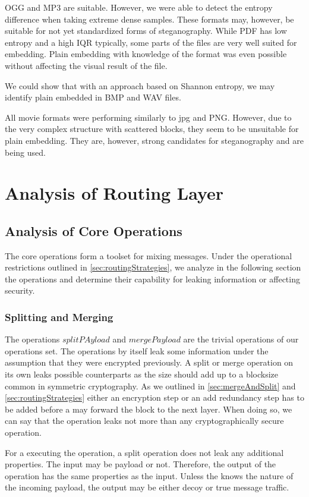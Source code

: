 OGG and MP3 are suitable. However, we were able to detect the entropy difference when taking extreme dense samples. These formats may, however, be suitable for not yet standardized forms of steganography. While PDF has low entropy and a high IQR typically, some parts of the files are very well suited for embedding. Plain embedding with knowledge of the format was even possible without affecting the visual result of the file.

We could show that with an approach based on Shannon entropy, we may identify plain embedded \VortexMessages in BMP and WAV files. 

All movie formats were performing similarly to jpg and PNG. However, due to the very complex structure with scattered blocks, they seem to be unsuitable for plain embedding. They are, however, strong candidates for steganography and are being used.

\section{Analysis of Routing Layer}
\subsection{Analysis of Core Operations}
The core operations form a toolset for mixing messages. Under the operational restrictions outlined in \cref{sec:routingStrategies}, we analyze in the following section the operations and determine their capability for leaking information or affecting security.

\subsubsection{Splitting and Merging}
The operations $splitPAyload$ and $mergePayload$ are the trivial operations of our operations set. The operations by itself leak some information under the assumption that they were encrypted previously. A split or merge operation on its own leaks possible counterparts as the size should add up to a blocksize common in symmetric cryptography. As we outlined in \cref{sec:mergeAndSplit} and \cref{sec:routingStrategies} either an encryption step or an add redundancy step has to be added before a \VortexNode{} may forward the block to the next layer. When doing so, we can say that the operation leaks not more than any cryptographically secure operation.

For a \VortexNode{} executing the operation, a split operation does not leak any additional properties. The input may be payload or not. Therefore, the output of the operation has the same properties as the input. Unless the \VortexNodes{} knows the nature of the incoming payload, the output may be either decoy or true message traffic.

